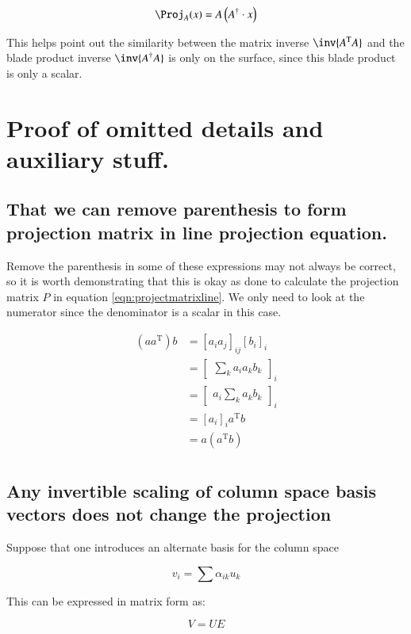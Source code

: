 \documentclass{article}      %
\newcommand{\T}[0]{{\text{T}}}
\begin{document}
\[
\Proj_A(x) = A \left(A^\dagger \cdot x\right)
\]

This helps point out the similarity between the matrix inverse $\inv{A^\T A}$ and the blade product inverse $\inv{{A^\dagger}A}$ is only on the surface,
since this blade product is only a scalar.

\section{ Proof of omitted details and auxiliary stuff. }

\subsection{ That we can remove parenthesis to form projection matrix in line projection equation. }

Remove the parenthesis in some of these expressions may not always be correct, so it is worth demonstrating that this is okay as
done to calculate the projection matrix $P$ in 
equation \ref{eqn:projectmatrixline}.
We only need to look at the numerator since the denominator is a scalar in this case.

\begin{align*}
(a a^\T) b
&= [ a_i a_j ]_{ij} [b_i]_i \\
&= 
{\begin{bmatrix}
\sum_k a_i a_k b_k
\end{bmatrix}
}_i \\
&= 
{\begin{bmatrix}
a_i \sum_k a_k b_k
\end{bmatrix}
}_i \\
&= [ a_i ]_i a^\T b \\
&= a (a^\T b) \\
\end{align*}



\subsection{ Any invertible scaling of column space basis vectors does not change the projection }


Suppose that one introduces an alternate basis for the column space


\[
v_i = \sum \alpha_{ik} u_k
\]

This can be expressed in matrix form as:

\[
V = U E
\]
\end{document}
